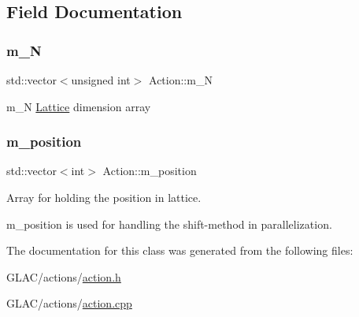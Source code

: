 \subsection{Field Documentation}
\mbox{\label{class_action_a80654d2311707f24689cd9e480edb2f6}} 
\subsubsection{\texorpdfstring{m\_N}{m\_N}}
{\footnotesize\ttfamily std\+::vector$<$unsigned int$>$ Action\+::m\+\_\+N\hspace{0.3cm}{\ttfamily [protected]}}



m\+\_\+N \mbox{\hyperlink{class_lattice}{Lattice}} dimension array 

\mbox{\label{class_action_a133fd17c83db233423855178bc81fb16}} 
\subsubsection{\texorpdfstring{m\_position}{m\_position}}
{\footnotesize\ttfamily std\+::vector$<$int$>$ Action\+::m\+\_\+position\hspace{0.3cm}{\ttfamily [protected]}}



Array for holding the position in lattice. 

m\+\_\+position is used for handling the shift-\/method in parallelization. 

The documentation for this class was generated from the following files\+:\begin{DoxyCompactItemize}
\item 
G\+L\+A\+C/actions/\mbox{\hyperlink{action_8h}{action.\+h}}\item 
G\+L\+A\+C/actions/\mbox{\hyperlink{action_8cpp}{action.\+cpp}}\end{DoxyCompactItemize}

